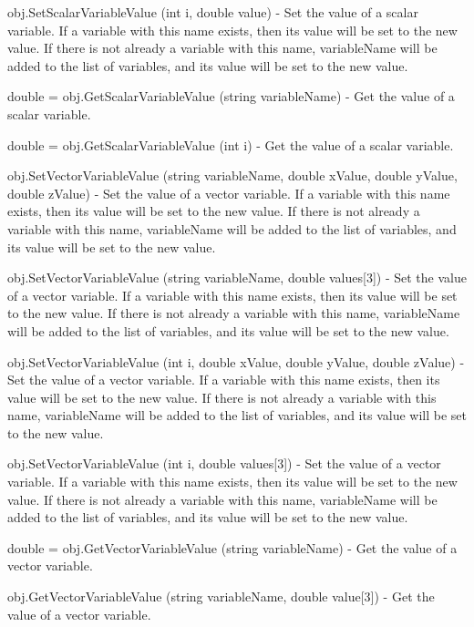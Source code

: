 \begin{DoxyItemize}
\item {\ttfamily obj.\-Set\-Scalar\-Variable\-Value (int i, double value)} -\/ Set the value of a scalar variable. If a variable with this name exists, then its value will be set to the new value. If there is not already a variable with this name, variable\-Name will be added to the list of variables, and its value will be set to the new value.  
\item {\ttfamily double = obj.\-Get\-Scalar\-Variable\-Value (string variable\-Name)} -\/ Get the value of a scalar variable.  
\item {\ttfamily double = obj.\-Get\-Scalar\-Variable\-Value (int i)} -\/ Get the value of a scalar variable.  
\item {\ttfamily obj.\-Set\-Vector\-Variable\-Value (string variable\-Name, double x\-Value, double y\-Value, double z\-Value)} -\/ Set the value of a vector variable. If a variable with this name exists, then its value will be set to the new value. If there is not already a variable with this name, variable\-Name will be added to the list of variables, and its value will be set to the new value.  
\item {\ttfamily obj.\-Set\-Vector\-Variable\-Value (string variable\-Name, double values\mbox{[}3\mbox{]})} -\/ Set the value of a vector variable. If a variable with this name exists, then its value will be set to the new value. If there is not already a variable with this name, variable\-Name will be added to the list of variables, and its value will be set to the new value.  
\item {\ttfamily obj.\-Set\-Vector\-Variable\-Value (int i, double x\-Value, double y\-Value, double z\-Value)} -\/ Set the value of a vector variable. If a variable with this name exists, then its value will be set to the new value. If there is not already a variable with this name, variable\-Name will be added to the list of variables, and its value will be set to the new value.  
\item {\ttfamily obj.\-Set\-Vector\-Variable\-Value (int i, double values\mbox{[}3\mbox{]})} -\/ Set the value of a vector variable. If a variable with this name exists, then its value will be set to the new value. If there is not already a variable with this name, variable\-Name will be added to the list of variables, and its value will be set to the new value.  
\item {\ttfamily double = obj.\-Get\-Vector\-Variable\-Value (string variable\-Name)} -\/ Get the value of a vector variable.  
\item {\ttfamily obj.\-Get\-Vector\-Variable\-Value (string variable\-Name, double value\mbox{[}3\mbox{]})} -\/ Get the value of a vector variable.  

\end{DoxyItemize}
